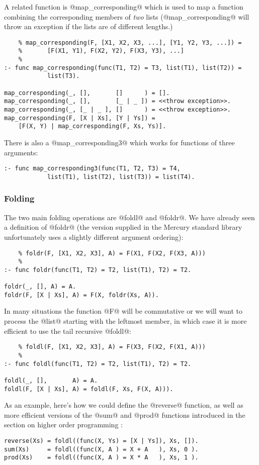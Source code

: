 A related function is @map_corresponding@ which is used to map a
function combining the corresponding members of \emph{two} lists
(@map_corresponding@ will throw an exception if the lists are of
different lengths.)
\begin{verbatim}
    % map_corresponding(F, [X1, X2, X3, ...], [Y1, Y2, Y3, ...]) =
    %       [F(X1, Y1), F(X2, Y2), F(X3, Y3), ...]
    %
:- func map_corresponding(func(T1, T2) = T3, list(T1), list(T2)) =
            list(T3).

map_corresponding(_, [],       []      ) = [].
map_corresponding(_, [],       [_ | _ ]) = <<throw exception>>.
map_corresponding(_, [_ | _ ], []      ) = <<throw exception>>.
map_corresponding(F, [X | Xs], [Y | Ys]) =
    [F(X, Y) | map_corresponding(F, Xs, Ys)].
\end{verbatim}

There is also a @map_corresponding3@ which works for functions of three
arguments:
\begin{verbatim}
:- func map_corresponding3(func(T1, T2, T3) = T4,
            list(T1), list(T2), list(T3)) = list(T4).
\end{verbatim}


\subsubsection{Folding}

The two main folding operations are @foldl@ and @foldr@.  We have
already seen a definition of @foldr@ (the version supplied in the
Mercury standard library unfortunately uses a slightly different
argument ordering):
\begin{verbatim}
    % foldr(F, [X1, X2, X3], A) = F(X1, F(X2, F(X3, A)))
    %
:- func foldr(func(T1, T2) = T2, list(T1), T2) = T2.

foldr(_, [], A) = A.
foldr(F, [X | Xs], A) = F(X, foldr(Xs, A)).
\end{verbatim}
In many situations the function @F@ will be commutative or we will want
to process the @list@ starting with the leftmost member, in which case
it is more efficient to use the tail recursive @foldl@:
\begin{verbatim}
    % foldl(F, [X1, X2, X3], A) = F(X3, F(X2, F(X1, A)))
    %
:- func foldl(func(T1, T2) = T2, list(T1), T2) = T2.

foldl(_, [],       A) = A.
foldl(F, [X | Xs], A) = foldl(F, Xs, F(X, A))).
\end{verbatim}
As an example, here's how we could define the @reverse@ function, as
well as more efficient versions of the @sum@ and @prod@ functions
introduced in the section on higher order programming \XXX{}:
\begin{verbatim}
reverse(Xs) = foldl((func(X, Ys) = [X | Ys]), Xs, []).
sum(Xs)     = foldl((func(X, A ) = X + A   ), Xs, 0 ).
prod(Xs)    = foldl((func(X, A ) = X * A   ), Xs, 1 ).
\end{verbatim}

